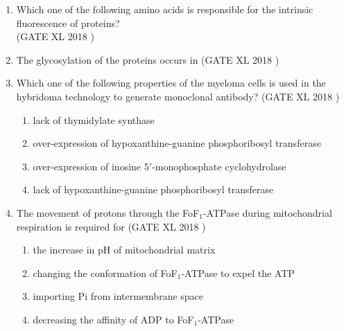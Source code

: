 \documentclass[14pt]{extarticle}
\begin{document}
\begin{flushleft}
\begin{enumerate}[leftmargin=*]
\item Which one of the following amino acids is responsible for the intrinsic fluorescence of proteins?\\
\hfill(GATE XL 2018 )\\
\begin{enumerate}[label=(\Alph*)]
\end{enumerate}
\item The glycosylation of the proteins occurs in
\hfill(GATE XL 2018 )\\
\begin{enumerate}[label=(\Alph*)]
\end{enumerate}


\item Which one of the following properties of the myeloma cells is used in the hybridoma technology to generate monoclonal antibody?
\hfill(GATE XL 2018 )\\
\begin{enumerate}[label=(\Alph*)]
    \item lack of thymidylate synthase
    \item over-expression of hypoxanthine-guanine phosphoribosyl transferase
    \item over-expression of inosine 5$'$-monophosphate cyclohydrolase
    \item lack of hypoxanthine-guanine phosphoribosyl transferase
\end{enumerate}


\item The movement of protons through the FoF$_1$-ATPase during mitochondrial respiration is required for
\hfill(GATE XL 2018 )\\
\begin{enumerate}[label=(\Alph*)]
    \item the increase in pH of mitochondrial matrix
    \item changing the conformation of FoF$_1$-ATPase to expel the ATP
    \item importing Pi from intermembrane space
    \item decreasing the affinity of ADP to FoF$_1$-ATPase
\end{enumerate}



\end{enumerate}
\end{flushleft}
\end{document}
